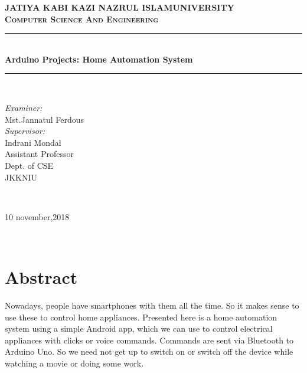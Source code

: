 \documentclass[10pt]{article}
\begin{document}
	\begin{titlepage}
		\centering
		\vspace*{0.5 cm}
		\textsc{\bfseries\LARGE JATIYA KABI KAZI NAZRUL ISLAM\newline\newline UNIVERSITY}\\[2.0 cm]	
		\textsc{\bfseries\Large Computer Science And Engineering}\\[0.5 cm]			
		\rule{\linewidth}{0.2 mm} \\[0.4 cm]
		\bfseries \Huge Arduino Projects: Home Automation System
		\rule{\linewidth}{0.2 mm} \\[1.5 cm]
		
		\begin{minipage}{0.4\textwidth}
			\begin{flushleft} \large
			\centering	\emph{	Examiner:}\\
			 Mst.Jannatul Ferdous \\
			 	\centering	\emph{	Supervisor:}\\
			Indrani Mondal\\
			Assistant Professor\\
			Dept. of CSE\\
			JKKNIU\\
			\end{flushleft}
		\end{minipage}\\[4 cm]   
	\begin{minipage}{0.4\textwidth}
\centering\large 10 november,2018
	\end{minipage}\\[4 cm]  
		
	\end{titlepage}
\section*{Abstract}
\large Nowadays, people have smartphones with them all the time. So it makes sense to use these to control home appliances.\vspace*{0.5 cm} Presented here is a home automation system using a simple Android app, which we can use to control electrical appliances with clicks or voice commands. Commands are sent via Bluetooth to Arduino Uno.\vspace*{0.5 cm} So we need not get up to switch on or switch off the device while watching a movie or doing some work.
\cleardoublepage
\end{document}

